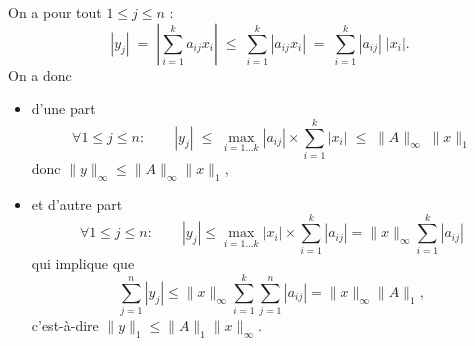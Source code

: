 \proof On a pour tout $1 \leq j \leq n$ :
$$
|y_j| 
\; = \; \left|\sum_{i=1}^k a_{ij} x_i \right| 
\; \leq \; \sum_{i=1}^k |a_{ij} x_i| 
\; = \; \sum_{i=1}^k |a_{ij}| \; |x_i|.
$$
On a donc
\begin{itemize}
  \item d'une part
  $$
  \forall 1 \leq j \leq n: \qquad |y_j| 
  \; \leq \; \max_{i=1 \dots k} |a_{ij}| \times \sum_{i=1}^k |x_i| 
  \; \leq \; \|A\|_\infty \; \|x\|_1
  $$
  donc $\|y\|_\infty \leq \|A\|_\infty \|x\|_1$,
  \item et d'autre part
  $$
  \forall 1 \leq j \leq n: \qquad |y_j| 
  \leq \max_{i=1 \dots k} |x_i| \times \sum_{i=1}^k |a_{ij}| = \|x\|_\infty \sum_{i=1}^k |a_{ij}| 
  $$
  qui implique que
  $$
  \sum_{j=1}^n |y_j| 
  \leq \|x\|_\infty \sum_{i=1}^k \sum_{j=1}^n |a_{ij}| = \|x\|_\infty \|A\|_1,
  $$
  c'est-à-dire $\|y\|_1 \leq \|A\|_1 \|x\|_\infty$.
\end{itemize}
\eproof

